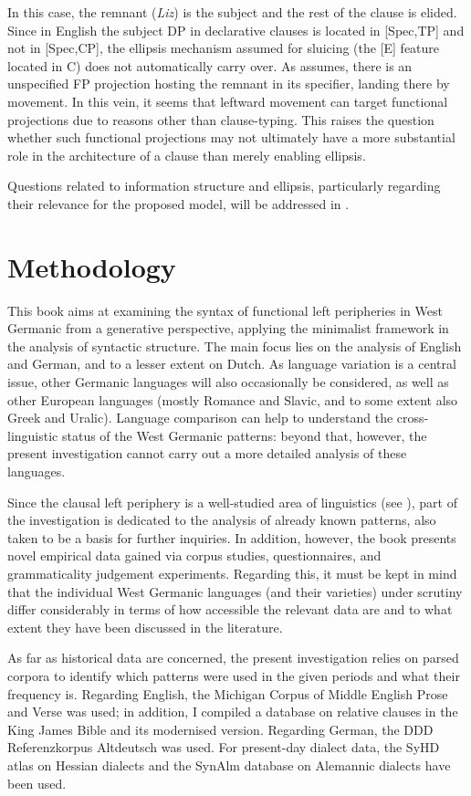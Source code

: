 In this case, the remnant (\textit{Liz}) is the subject and the rest of the clause is elided. Since in English the subject DP in declarative clauses is located in [Spec,TP] and not in [Spec,CP], the ellipsis mechanism assumed for sluicing (the [E] feature located in C) does not automatically carry over. As \citet{merchant2004} assumes, there is an unspecified FP projection hosting the remnant in its specifier, landing there by movement. In this vein, it seems that leftward movement can target functional projections due to reasons other than clause-typing. This raises the question whether such functional projections may not ultimately have a more substantial role in the architecture of a clause than merely enabling ellipsis.

Questions related to information structure and ellipsis, particularly regarding their relevance for the proposed model, will be addressed in .

\section{Methodology}
This book aims at examining the syntax of functional left peripheries in West Germanic from a generative perspective, applying the minimalist framework in the analysis of syntactic structure. The main focus lies on the analysis of English and German, and to a lesser extent on Dutch. As language variation is a central issue, other Germanic languages will also occasionally be considered, as well as other European languages (mostly Romance and Slavic, and to some extent also Greek and Uralic). Language comparison can help to understand the cross-linguistic status of the West Germanic patterns: beyond that, however, the present investigation cannot carry out a more detailed analysis of these languages. 

Since the clausal left periphery is a well-studied area of linguistics (see ), part of the investigation is dedicated to the analysis of already known patterns, also taken to be a basis for further inquiries. In addition, however, the book presents novel empirical data gained via corpus studies, questionnaires, and grammaticality judgement experiments. Regarding this, it must be kept in mind that the individual West Germanic languages (and their varieties) under scrutiny differ considerably in terms of how accessible the relevant data are and to what extent they have been discussed in the literature. 

As far as historical data are concerned, the present investigation relies on parsed corpora to identify which patterns were used in the given periods and what their frequency is. Regarding English, the Michigan Corpus of Middle English Prose and Verse was used; in addition, I compiled a database on relative clauses in the King James Bible and its modernised version. Regarding German, the DDD Referenzkorpus Altdeutsch was used. For present-day dialect data, the SyHD atlas on Hessian dialects and the SynAlm database on Alemannic dialects have been used.

